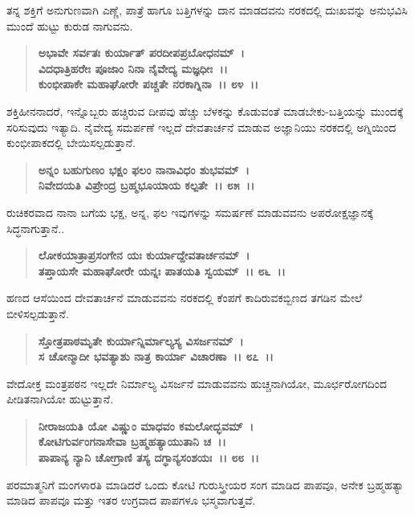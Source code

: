ತನ್ನ ಶಕ್ತಿಗೆ ಅನುಗುಣವಾಗಿ ಎಣ್ಣೆ, ಪಾತ್ರೆ ಹಾಗೂ ಬತ್ತಿಗಳನ್ನು ದಾನ ಮಾಡದವನು ನರಕದಲ್ಲಿ ದುಃಖವನ್ನು ಅನುಭವಿಸಿ ಮುಂದೆ ಹುಟ್ಟು ಕುರುಡ ನಾಗುವನು.

\begin{verse}
\textbf{ಅಭಾವೇ ಸರ್ವತಃ ಕುರ್ಯಾತ್ ಪರದೀಪಪ್ರಬೋಧನಮ್~।}\\\textbf{ವಿದಧಾತ್ರಿಹರೇಃ ಪೂಜಾಂ ನಿನಾ ನೈವೇದ್ಯ ಮಜ್ಞಧೀಃ~।।}\\\textbf{ಕುಂಭೀಪಾಕೇ ಮಹಾಘೋರೇ ಪಚ್ಚತೇ ನರಕಾಗ್ನಿನಾ~।। ೮೪~।।}
\end{verse}

ಶಕ್ತಿಹೀನನಾದರೆ, ಇನ್ನೊಬ್ಬರು ಹಚ್ಚಿರುವ ದೀಪವು ಹೆಚ್ಚು ಬೆಳಕನ್ನು ಕೊಡುವಂತೆ ಮಾಡಬೇಕು-ಬತ್ತಿಯನ್ನು ಮುಂದಕ್ಕೆ ಸರಿಸುವುದು ಇತ್ಯಾದಿ. ನೈವೇದ್ಯ ಸಮರ್ಪಣೆ ಇಲ್ಲದೆ ದೇವತಾರ್ಚನೆ ಮಾಡುವ ಅಜ್ಞಾನಿಯು ನರಕದಲ್ಲಿ ಅಗ್ನಿಯಿಂದ ಕುಂಭೀಪಾಕದಲ್ಲಿ ಬೇಯಿಸಲ್ಪಡುತ್ತಾನೆ.

\begin{verse}
\textbf{ಅನ್ನಂ ಬಹುಗುಣಂ ಭಕ್ಷಂ ಫಲಂ ನಾನಾವಿಧಂ ಶುಭವಮ್~।}\\\textbf{ನಿವೇದಯತಿ ವಿಪ್ರೇಂದ್ರ ಬ್ರಹ್ಮಭೂಯಾಯ ಕಲ್ಪತೇ~।। ೮೫~।।}
\end{verse}

ರುಚಿಕರವಾದ ನಾನಾ ಬಗೆಯ ಭಕ್ಷ, ಅನ್ನ, ಫಲ ಇವುಗಳನ್ನು ಸಮರ್ಷಣೆ ಮಾಡುವವನು ಅಪರೋಕ್ಷಜ್ಞಾನಕ್ಕೆ ಸಿದ್ಧನಾಗುತ್ತಾನೆ..

\begin{verse}
\textbf{ಲೋಕಯಾತ್ರಾಪ್ರಸಂಗೇನ ಯಃ ಕುರ್ಯಾದ್ದೇವತಾರ್ಚನಮ್~।}\\\textbf{ತಪ್ತಾಯಸೇ ಮಹಾಘೋರೇ ಯನ್ನಃ ಪಾತಯತಿ ಸ್ವಯಮ್~।। ೮೬~।।}
\end{verse}

ಹಣದ ಆಸೆಯಿಂದ ದೇವತಾರ್ಚನೆ ಮಾಡುವವನು ನರಕದಲ್ಲಿ ಕೆಂಪಗೆ ಕಾದಿರುವ\break ಕಬ್ಬಿಣದ ತಗಡಿನ ಮೇಲೆ ಬೀಳಿಸಲ್ಪಡುತ್ತಾನೆ.

\begin{verse}
\textbf{ಸ್ತೋತ್ರಪಾಠಮೃತೇ ಕುರ್ಯಾನ್ನಿರ್ಮಾಲ್ಯಸ್ಯ ವಿಸರ್ಜನಮ್~।}\\\textbf{ಸ ಚೋನ್ಮಾದೀ ಭವತ್ಯಾಶು ನಾತ್ರ ಕಾರ್ಯಾ ವಿಚಾರಣಾ~।। ೮೭~।।}
\end{verse}

ವೇದೋಕ್ತ ಮಂತ್ರಪಠನ ಇಲ್ಲದೇ ನಿರ್ಮಾಲ್ಯ ವಿಸರ್ಜನೆ ಮಾಡುವವನು ಹುಚ್ಚನಾಗಿಯೋ, ಮೂರ್ಛರೋಗದಿಂದ ಪೀಡಿತನಾಗಿಯೋ ಹುಟ್ಟುತ್ತಾನೆ.

\begin{verse}
\textbf{ನೀರಾಜಯತಿ ಯೋ ವಿಷ್ಣುಂ ಮಾಧವಂ ಕಮಲೋದ್ಭವಮ್~।}\\\textbf{ಕೋಟಿಗುರ್ವಂಗನಾಸೇವಾ ಬ್ರಹ್ಮಹತ್ಯಾಯುತಾನಿ ಚ~।।}\\\textbf{ಪಾಪಾನ್ಯ ನ್ಯಾನಿ ಚೋಗ್ರಾಣಿ ತಸ್ಯ ದಗ್ಧಾನ್ಯಸಂಶಯಃ~।। ೮೮~।।}
\end{verse}

ಪರಮಾತ್ಮನಿಗೆ ಮಂಗಳಾರತಿ ಮಾಡಿದರೆ ಒಂದು ಕೋಟಿ ಗುರುಸ್ತ್ರೀಯರ ಸಂಗ ಮಾಡಿದ ಪಾಪವೂ, ಅನೇಕ ಬ್ರಹ್ಮಹತ್ಯಾ ಮಾಡಿದ ಪಾಪವೂ ಮತ್ತು ಇತರ ಉಗ್ರವಾದ ಪಾಪಗಳೂ ಭಸ್ಮವಾಗುತ್ತವೆ.

